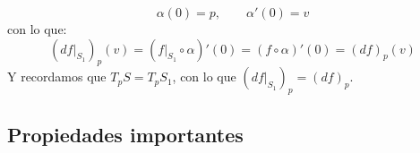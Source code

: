 \begin{ejemplo}
\begin{enumerate}
            \begin{equation*}
                \alpha(0) = p, \qquad \alpha'(0) = v
            \end{equation*}
            con lo que:
            \begin{equation*}
                \left(d f\big|_{S_1}\right)_p(v) = \left(f\big|_{S_1}\circ \alpha\right)'(0) = (f\circ \alpha)'(0) = (d f)_p(v)
            \end{equation*}
            Y recordamos que $T_pS = T_pS_1$, con lo que $\left(d f\big|_{S_1}\right)_p = (d f)_p$.
    \end{enumerate}
\end{ejemplo}

\subsection{Propiedades importantes}
